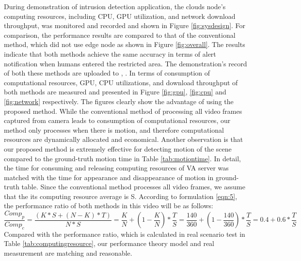 During demonstration of  intrusion detection application, the clouds node’s computing resources, including CPU, GPU utilization, and network download throughput, was monitored and recorded and shown in Figure \ref{fig:sysdesign}. For comparison, the performance results are compared to that of the conventional method, which did not use edge node as shown in Figure \ref{fig:overall}. The results indicate that both methods achieve the same accuracy in terms of alert notification when humans entered the restricted area. The demonstration's record of both these methods are uploaded to \cite{convential}, \cite{proposed}. In terms of consumption of computational resources, GPU, CPU utilizations, and download throughput of both methods are measured and presented in Figure \ref{fig:gpu}, \ref{fig:cpu} and \ref{fig:network} respectively. The figures clearly show the advantage of using the proposed method. While the conventional method of processing all video frames captured from camera leads to consumption of computational resources, our method only processes when there is motion, and therefore computational resources are dynamically allocated and economical. Another observation is that our proposed method is extremely effective for detecting motion of the scene compared to the ground-truth motion time in Table \ref{tab:motiontime}. In detail,  the time for consuming and releasing computing resources of VA server was matched with the time for appearance and disappearance of motion in ground-truth table. Since the conventional method processes all video frames, we assume that the its computing resource average is S. According to formulation \ref{eqn:5}, the performance ratio of both methods in this video will be as follows:\\
\begin{equation}
\label{eqn:10}
\frac{Comp_{p}}{Comp_{c}}=\frac{(K*S+(N-K)*T)}{N*S}=\frac{K}{N} + (1 - \frac{K}{N})*\frac{T}{S}=\frac{140}{360} + (1 - \frac{140}{360})*\frac{T}{S} = 0.4 + 0.6*\frac{T}{S}
\end{equation}
Compared with the performance ratio, which is calculated in real scenario test in Table \ref{tab:computingresource}, our performance theory model and real measurement are matching and reasonable.